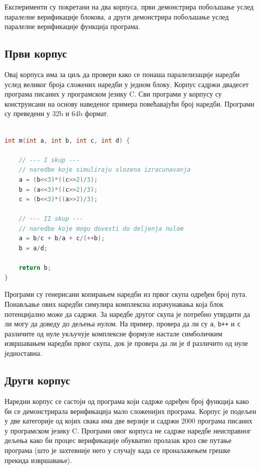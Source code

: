 \documentclass[12pt,oneside]{memoir}
\begin{document}
  Експерименти су покретани на два корпуса, први демонстрира побољшање услед паралелне верификације блокова, а други демонстрира побољшање услед паралелне верификације функција програма.
  \subsection{Први корпус}
  
 Овај корпуса има за циљ да провери како се понаша паралелизације наредби услед великог броја сложених наредби у једном блоку. Корпус садржи двадесет програма писаних у програмском језику C. Сви програми у корпусу су конструисани на основу наведеног примера повећавајући број наредби. Програми су преведени у 32b и 64b формат. \newpage

  
\begin{lstlisting}[basicstyle=\fontsize{4}{4}\selectfont,language=C,frame=single,caption=Пример програма,label=primer1]

int m(int a, int b, int c, int d) {

	// --- I skup ---
	// naredbe koje simuliraju slozena izracunavanja
	a = (b<<3)*((c>>2)/3);
	b = (a<<3)*((c>>2)/3);
	c = (b<<3)*((a>>2)/3);

	// --- II skup --- 
	// naredbe koje mogu dovesti do deljenja nulom
	a = b/c + b/a + c/(++b);
	b = a/d;
	
	return b;
}
\end{lstlisting}
 Програми су генерисани копирањем наредби из првог скупа одређен број пута. Понављање ових наредби симулира комплексна израчунавања која блок потенцијално може да садржи. За наредбе другог скупа је потребно утврдити да ли могу да доведу до дељења нулом. На пример, провера да ли су \texttt{a}, \texttt{b++} и \texttt{c} различите од нуле укључује комплексне формуле настале симболичким извршавањем наредби првог скупа, док је провера да ли је \texttt{d} различито од нуле једноставна.    


\subsection{Други корпус}

Наредни корпус се састоји од програма који садрже одређен број функција како би се демонстрирала верификација мало сложенијих програма. Корпус је подељен у две категорије од којих свака има две верзије и садржи 2000 програма писаних у програмском језику C. Програми овог корпуса не садрже наредбе неисправног дељења како би процес верификације обукватио пролазак кроз све путање програма (што је захтевније него у случају када се проналажењем грешке прекида извршавање).
\end{document}
